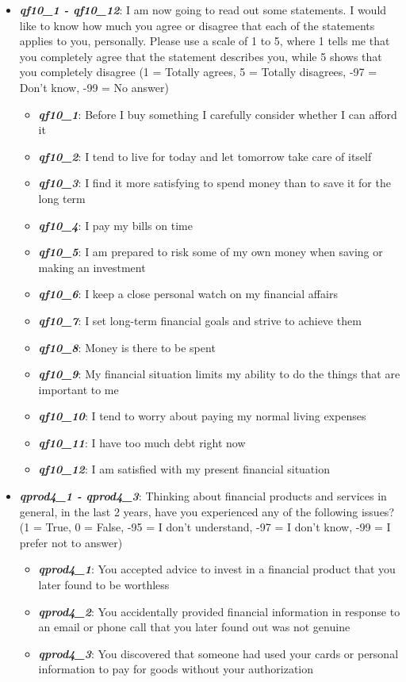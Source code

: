 \documentclass[a4paper,11pt]{article}
\begin{document}
\begin{itemize}
    \item \textit{\textbf{qf10\_1 - qf10\_12}}: I am now going to read out some statements. I would like to know how much you agree or disagree that each of the statements applies to you, personally. Please use a scale of 1 to 5, where 1 tells me that you completely agree that the statement describes you, while 5 shows that you completely disagree (1 = Totally agrees, 5 = Totally disagrees, -97 = Don’t know, -99 = No answer) 
    \begin{itemize}
        \item \textit{\textbf{qf10\_1}}: Before I buy something I carefully consider whether I can afford it
        \item \textit{\textbf{qf10\_2}}: I tend to live for today and let tomorrow take care of itself
        \item \textit{\textbf{qf10\_3}}: I find it more satisfying to spend money than to save it for the long term
        \item \textit{\textbf{qf10\_4}}: I pay my bills on time
        \item \textit{\textbf{qf10\_5}}: I am prepared to risk some of my own money when saving or making an investment
        \item \textit{\textbf{qf10\_6}}: I keep a close personal watch on my financial affairs
        \item \textit{\textbf{qf10\_7}}: I set long-term financial goals and strive to achieve them
        \item \textit{\textbf{qf10\_8}}: Money is there to be spent
        \item \textit{\textbf{qf10\_9}}: My financial situation limits my ability to do the things that are important to me
        \item \textit{\textbf{qf10\_10}}: I tend to worry about paying my normal living expenses
        \item \textit{\textbf{qf10\_11}}: I have too much debt right now
        \item \textit{\textbf{qf10\_12}}: I am satisfied with my present financial situation
    \end{itemize}
    
    \item \textit{\textbf{qprod4\_1 - qprod4\_3}}: Thinking about financial products and services in general, in the last 2 years, have you experienced any of the following issues? (1 = True, 0 = False, -95 = I don't understand, -97 = I don’t know, -99 = I prefer not to answer)
    \begin{itemize}
        \item \textit{\textbf{qprod4\_1}}: You accepted advice to invest in a financial product that you later found to be worthless
        \item \textit{\textbf{qprod4\_2}}: You accidentally provided financial information in response to an email or phone call that you later found out was not genuine
        \item \textit{\textbf{qprod4\_3}}: You discovered that someone had used your cards or personal information to pay for goods without your authorization
    \end{itemize}


\end{itemize}
\end{document}
